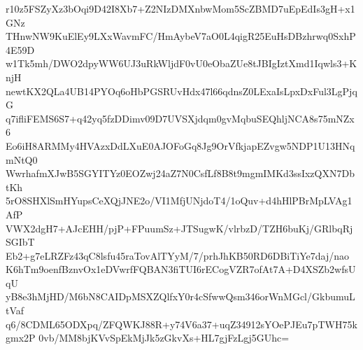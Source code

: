 r10z5FSZyXz3bOqi9D42I8Xb7+Z2NIzDMXnbwMom5ScZBMD7uEpEdIs3gH+x1GNz
THnwNW9KuElEy9LXxWavmFC/HmAybeV7aO0L4qigR25EuHsDBzhrwq0SxhP4E59D
w1Tk5mh/DWO2dpyWW6UJ3uRkWljdF0vU0eObaZUe8tJBIgIztXmd1Iqwls3+KnjH
newtKX2QLa4UB14PYOq6oHbPGSRUvHdx47l66qdnsZ0LExaIsLpxDxFul3LgPjqG
q7ifliFEMS6S7+q42yq5fzDDimv09D7UVSXjdqm0gvMqbuSEQhljNCA8s75mNZx6
Eo6iH8ARMMy4HVAzxDdLXuE0AJOFoGq8Jg9OrVfkjapEZvgw5NDP1U13HNqmNtQ0
WwrhafmXJwB5SGYITYz0EOZwj24aZ7N0CsfLf8B8t9mgmIMKd3ssIxzQXN7DbtKh
5rO8SHXlSmHYupsCeXQjJNE2o/VI1MfjUNjdoT4/1oQuv+d4hHlPBrMpLVAg1AfP
VWX2dgH7+AJcEHH/pjP+FPuumSz+JTSugwK/vlrbzD/TZH6buKj/GRlbqRjSGIbT
Eb2+g7eLRZFz43qC8lsfu45raTovAlTYyM/7/prhJhKB50RD6DBiTiYe7daj/nao
K6hTm9oenfBznvOx1eDVwrfFQBAN3fiTUI6rECogVZR7ofAt7A+D4XSZb2wfsUqU
yB8e3hMjHD/M6bN8CAIDpMSXZQlfxY0r4cSfwwQsm346orWnMGcl/GkbumuLtVaf
q6/8CDML65ODXpq/ZFQWKJ88R+y74V6a37+uqZ34912sYOePJEu7pTWH75kgmx2P
0vb/MM8bjKVvSpEkMjJk5zGkvXs+HL7gjFzLgj5GUhc=
